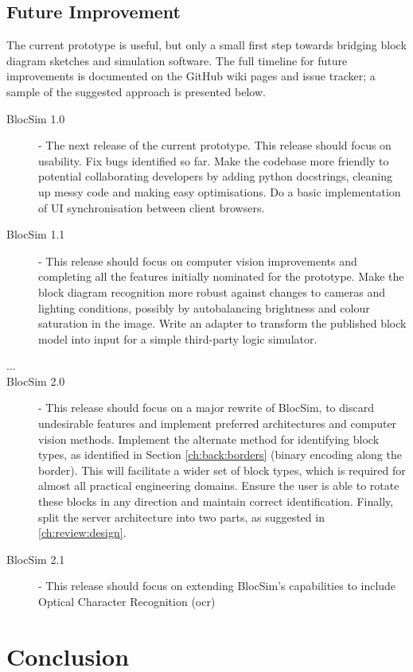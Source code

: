 \section{Future Improvement}

The current prototype is useful, but only a small first step towards bridging block diagram sketches and simulation software. The full timeline for future improvements is documented on the GitHub wiki pages and issue tracker; a sample of the suggested approach is presented below.

\begin{description}
	\item[BlocSim 1.0] - The next release of the current prototype. This release should focus on usability. Fix bugs identified so far. Make the codebase more friendly to potential collaborating developers by adding python docstrings, cleaning up messy code and making easy optimisations. Do a basic implementation of UI synchronisation between client browsers.
	\item[BlocSim 1.1] - This release should focus on computer vision improvements and completing all the features initially nominated for the prototype. Make the block diagram recognition more robust against changes to cameras and lighting conditions, possibly by autobalancing brightness and colour saturation in the image. Write an adapter to transform the published block model into input for a simple third-party logic simulator.
	\item[ ... ]
	\item[BlocSim 2.0] - This release should focus on a major rewrite of BlocSim, to discard undesirable features and implement preferred architectures and computer vision methods. Implement the alternate method for identifying block types, as identified in Section \ref{ch:back:borders} (binary encoding along the border). This will facilitate a wider set of block types, which is required for almost all practical engineering domains. Ensure the user is able to rotate these blocks in any direction and maintain correct identification. Finally, split the server architecture into two parts, as suggested in \ref{ch:review:design}. 
	\item[BlocSim 2.1] - This release should focus on extending BlocSim's capabilities to include Optical Character Recognition (\gls{ocr})
\end{description}


\chapter{Conclusion}

